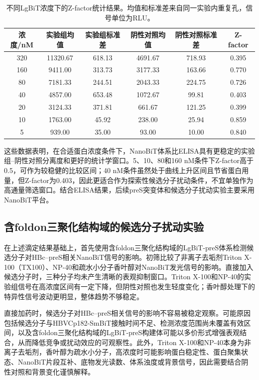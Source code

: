 \begin{table}[htb]
\centering
\caption{不同LgBiT浓度下的Z-factor统计结果。均值和标准差来自同一实验内重复孔，信号单位为RLU。}
\begin{tabular}{cccccc}
\toprule
浓度/nM & 实验组均值 & 实验组标准差 & 阴性对照均值 & 阴性对照标准差 & Z-factor \\
\midrule
320 & 11320.67 & 618.13 & 4691.67 & 718.93 & 0.395 \\
160 & 9411.00  & 313.73 & 3177.33 & 163.66 & 0.770 \\
80 & 7181.33  & 244.51 & 2043.33 & 224.75 & 0.726 \\
40  & 4857.00  & 653.48 & 1072.67 & 99.81  & 0.403 \\
20  & 3124.33  & 371.81 & 661.67  & 121.25 & 0.399 \\
10  & 1763.00  & 45.92  & 238.00  & 25.94  & 0.859 \\
5  & 939.00   & 35.00  & 93.00   & 10.00  & 0.840 \\
\bottomrule
\end{tabular}
\end{table}

这些数据表明，在合适蛋白浓度条件下，NanoBiT体系比ELISA具有更稳定的实验组--阴性对照分离度和更好的统计学窗口。5、10、80和160 nM条件下Z-factor高于0.5，可作为较稳健的比较区间；40 nM条件虽然处于曲线上升区间且节省蛋白用量，但Z-factor为0.403，因此更适合作为探索性候选分子扰动条件，不宜单独作为高通量筛选窗口。结合ELISA结果，后续preS突变体和候选分子扰动实验主要采用NanoBiT平台。

\subsection{含foldon三聚化结构域的候选分子扰动实验}

在上述滴定结果基础上，首先使用含foldon三聚化结构域的LgBiT-preS体系检测候选分子对HBc--preS相关NanoBiT信号的影响。初筛比较了非离子去垢剂Triton X-100（TX100）、NP-40和疏水小分子香叶醇对NanoBiT发光信号的影响。直接加入候选分子时，三种分子均未产生清晰的表观抑制窗口。Triton X-100和NP-40的实验组信号在高浓度区间有一定下降，但阴性对照也发生轻度变化；香叶醇处理下的特异性信号波动更明显，整体趋势不够稳定。

直接加药时，候选分子对HBc--preS相关信号的影响不容易被稳定观察。可能原因包括候选分子与HBVCp182-SmBiT接触时间不足、检测浓度范围尚未覆盖有效区间，以及含foldon三聚化结构域的LgBiT-preS构建体可能以多价形式增强表观结合，从而降低竞争或扰动效应的可观察性。此外，Triton X-100和NP-40本身为非离子去垢剂，香叶醇为疏水小分子，高浓度时可能影响蛋白稳定性、蛋白聚集状态、NanoBiT片段互补、底物发光读数、体系浊度或背景信号，因此需要结合阴性对照和背景变化谨慎解释。

